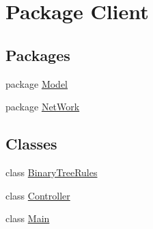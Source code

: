 \hypertarget{namespaceClient}{}\section{Package Client}
\label{namespaceClient}
\subsection*{Packages}
\begin{DoxyCompactItemize}
\item 
package \mbox{\hyperlink{namespaceClient_1_1Model}{Model}}
\item 
package \mbox{\hyperlink{namespaceClient_1_1NetWork}{Net\+Work}}
\end{DoxyCompactItemize}
\subsection*{Classes}
\begin{DoxyCompactItemize}
\item 
class \mbox{\hyperlink{classClient_1_1BinaryTreeRules}{Binary\+Tree\+Rules}}
\item 
class \mbox{\hyperlink{classClient_1_1Controller}{Controller}}
\item 
class \mbox{\hyperlink{classClient_1_1Main}{Main}}
\end{DoxyCompactItemize}
